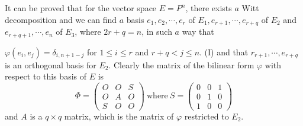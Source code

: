 It can be proved that for the vector space $E=P^n$, there exists $a$
Witt decomposition and we can find $a$ basis $ e_1, e_2, \cdots,  e_r$ 
of $E_1, e_{r+1},\cdots,  e_{r+q}$ of $E_2$ and $e_{r+q+1}, \cdots, 
e_n$ of $E_3$, where $2r+q = n$, in such $a$ way that 

$\varphi (e_i, e_j)= \delta_{i,n+1-j}$  for $1 \leq i \leq r$ and 
$r+q < j \leq n$. (I) and that $ r_{r+1}, \cdots, e_{r+q}$  is an
orthogonal basis for $E_2$. Clearly the matrix of the bilinear form
$\varphi$ with respect to this basis of $E$ is  
\begin{equation*}
  \Phi=
  \begin{pmatrix}
    O&O&S\\
    O&A&O\\
    S&O&O
  \end{pmatrix}
  ~\text{where}~ S = 
  \begin{pmatrix}
    0&0&1\\
    0&1&0\\
    1&0&0
  \end{pmatrix}
\end{equation*}
and $A$ is a $q \times q$  matrix, which is the matrix of $\varphi$
restricted to $E_2$. 

